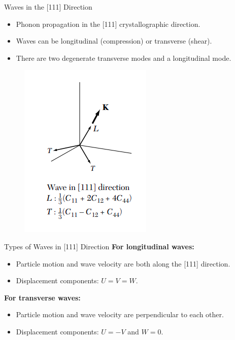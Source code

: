 \documentclass[aspectratio=43]{beamer}
\begin{document}
\begin{frame}{Waves in the [111] Direction}
    \begin{itemize}
        \item Phonon propagation in the [111] crystallographic direction.
        \item Waves can be longitudinal (compression) or transverse (shear).
        \item There are two degenerate transverse modes and a longitudinal mode.
    \end{itemize}
    \begin{figure}
        \centering
        \includegraphics[width=0.3\linewidth]{images/1.png}
    \end{figure}
\end{frame}

\begin{frame}{Types of Waves in [111] Direction}
    \textbf{For longitudinal waves:}
    \begin{itemize}
        \item Particle motion and wave velocity are both along the [111] direction.
        \item Displacement components: $U = V = W$.
    \end{itemize}
    \vspace{0.3cm}
      \textbf{For transverse waves:}
    \begin{itemize}
        \item Particle motion and wave velocity are perpendicular to each other.
        \item Displacement components: $U = -V$ and $W=0$.
    \end{itemize}
\end{frame}
\end{document}
